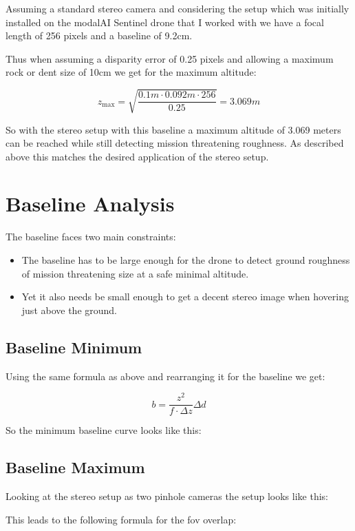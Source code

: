 Assuming a standard stereo camera and considering the setup which was initially installed on the modalAI Sentinel drone that I worked with we have a focal length of 256 pixels and a baseline of 9.2cm.

Thus when assuming a disparity error of 0.25 pixels and allowing a maximum rock or dent size of 10cm we get for the maximum altitude:

\begin{equation}
    z_{\text{max}} = \sqrt{\frac{0.1m \cdot 0.092 m \cdot 256}{0.25}} = 3.069m
\end{equation}

So with the stereo setup with this baseline a maximum altitude of 3.069 meters can be reached while still detecting mission threatening roughness. As described above this matches the desired application of the stereo setup.




\section{Baseline Analysis}
The baseline faces two main constraints:
\begin{itemize}
    \item The baseline has to be large enough for the drone to detect ground roughness of mission threatening size at a safe minimal altitude.
    \item Yet it also needs be small enough to get a decent stereo image when hovering just above the ground.
\end{itemize}

\subsection{Baseline Minimum}

Using the same formula as above and rearranging it for the baseline we get:

\begin{equation}
    b = \frac{z^2}{f \cdot \Delta z} \Delta d
\end{equation}

So the minimum baseline curve looks like this:

\subsection{Baseline Maximum}

Looking at the stereo setup as two pinhole cameras the setup looks like this:


This leads to the following formula for the fov overlap:



